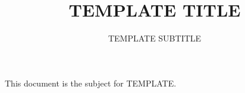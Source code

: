 \documentclass{42-en}
\begin{document}
\title{TEMPLATE TITLE}
\subtitle{TEMPLATE SUBTITLE}

\summary
{
This document is the subject for TEMPLATE.
}

\maketitle

\tableofcontents
\end{document}
